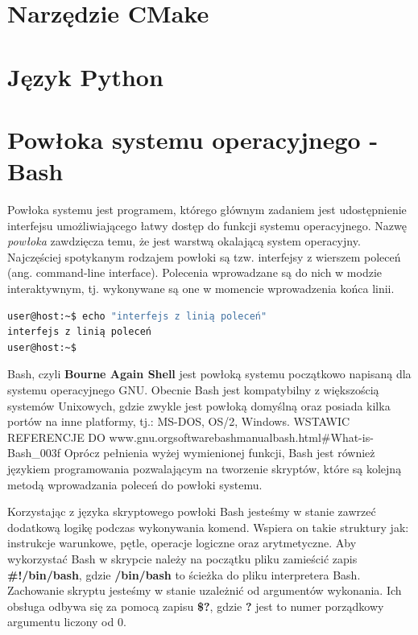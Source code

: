 \section{Narzędzie CMake}
\section{Język Python}
\section{Powłoka systemu operacyjnego - Bash}
Powłoka systemu jest programem, którego głównym zadaniem jest udostępnienie interfejsu umożliwiającego łatwy dostęp do funkcji systemu operacyjnego. Nazwę \textit{powłoka} zawdzięcza temu, że jest warstwą okalającą system operacyjny. Najczęściej spotykanym rodzajem powłoki są tzw. interfejsy z wierszem poleceń (ang. command-line interface). Polecenia wprowadzane są do nich w modzie interaktywnym, tj. wykonywane są one w momencie wprowadzenia końca linii.

\begin{lstlisting}[language=bash,caption={Komenda wypisująca tekst na standardowe wyjście wykonana z linii poleceń}]
user@host:~$ echo "interfejs z linią poleceń"
interfejs z linią poleceń
user@host:~$
\end{lstlisting}

Bash, czyli \textbf{Bourne Again Shell} jest powłoką systemu początkowo napisaną dla systemu operacyjnego GNU. Obecnie Bash jest kompatybilny z większością systemów Unixowych, gdzie zwykle jest powłoką domyślną oraz posiada kilka portów na inne platformy, tj.: MS-DOS, OS/2, Windows. WSTAWIC REFERENCJE DO www.gnu.org\/software\/bash\/manual\/bash.html\#What-is-Bash\_003f Oprócz pełnienia wyżej wymienionej funkcji, Bash jest również językiem programowania pozwalającym na tworzenie skryptów, które są kolejną metodą wprowadzania poleceń do powłoki systemu.\par
Korzystając z języka skryptowego powłoki Bash jesteśmy w stanie zawrzeć dodatkową logikę podczas wykonywania komend. Wspiera on takie struktury jak: instrukcje warunkowe, pętle, operacje logiczne oraz arytmetyczne. Aby wykorzystać Bash w skrypcie należy na początku pliku zamieścić zapis \textbf{\#!/bin/bash}, gdzie \textbf{/bin/bash} to ścieżka do pliku interpretera Bash. Zachowanie skryptu jesteśmy w stanie uzależnić od argumentów wykonania. Ich obsługa odbywa się za pomocą zapisu \textbf{\$?}, gdzie \textbf{?} jest to numer porządkowy argumentu liczony od 0.

